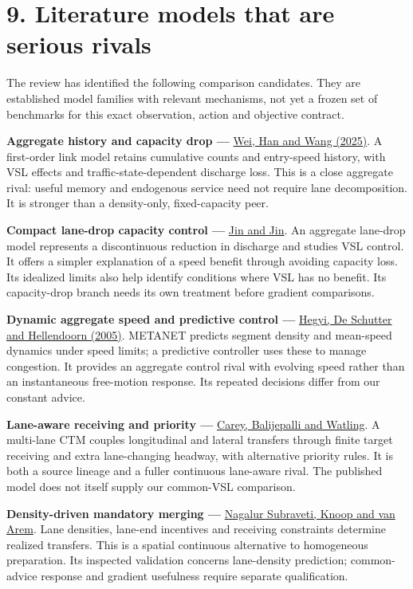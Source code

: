 \documentclass[11pt,a4paper]{article}
\begin{document}
\newpage
\section*{9. Literature models that are serious rivals}
The review has identified the following comparison candidates. They are
established model families with relevant mechanisms, not yet a frozen set
of benchmarks for this exact observation, action and objective contract.

\textbf{Aggregate history and capacity drop ---}
\href{https://doi.org/10.1111/mice.13492}{Wei, Han and Wang (2025)}.
A first-order link model retains cumulative counts and entry-speed history,
with VSL effects and traffic-state-dependent discharge loss. This is a close
aggregate rival: useful memory and endogenous service need not require
lane decomposition. It is stronger than a density-only, fixed-capacity peer.

\textbf{Compact lane-drop capacity control ---}
\href{https://arxiv.org/abs/1310.2658}{Jin and Jin}.
An aggregate lane-drop model represents a discontinuous reduction in
discharge and studies VSL control. It offers a simpler explanation of a
speed benefit through avoiding capacity loss. Its idealized limits also
help identify conditions where VSL has no benefit. Its capacity-drop
branch needs its own treatment before gradient comparisons.

\textbf{Dynamic aggregate speed and predictive control ---}
\href{https://www.dcsc.tudelft.nl/~bdeschutter/pub/rep/03_016.pdf}{Hegyi,
De Schutter and Hellendoorn (2005)}.
METANET predicts segment density and mean-speed dynamics under speed limits;
a predictive controller uses these to manage congestion. It provides an
aggregate control rival with evolving speed rather than an instantaneous
free-motion response. Its repeated decisions differ from our constant advice.

\textbf{Lane-aware receiving and priority ---}
\href{https://doi.org/10.1007/s11067-013-9193-7}{Carey, Balijepalli and Watling}.
A multi-lane CTM couples longitudinal and lateral transfers through finite
target receiving and extra lane-changing headway, with alternative priority
rules. It is both a source lineage and a fuller continuous lane-aware rival.
The published model does not itself supply our common-VSL comparison.

\textbf{Density-driven mandatory merging ---}
\href{https://doi.org/10.1080/21680566.2019.1700846}{Nagalur Subraveti,
Knoop and van Arem}.
Lane densities, lane-end incentives and receiving constraints determine
realized transfers. This is a spatial continuous alternative to homogeneous
preparation. Its inspected validation concerns lane-density prediction;
common-advice response and gradient usefulness require separate qualification.
\end{document}
